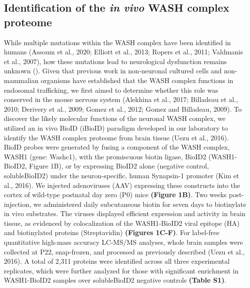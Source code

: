
\subsection{Identification of the \textit{in vivo} WASH complex proteome}

While multiple mutations within the WASH complex have been identified in humans 
(Assoum et al., 2020; Elliott et al., 2013; Ropers et al., 2011; 
Valdmanis et al., 2007), how these mutations lead to neurological
dysfunction remains unknown (). Given that previous work in
non-neuronal cultured cells and non-mammalian organisms have established that
the WASH complex functions in endosomal trafficking, we first aimed to determine
whether this role was conserved in the mouse nervous system (Alekhina et al.,
2017; Billadeau et al., 2010; Derivery et al., 2009; Gomez et al., 2012; Gomez
and Billadeau, 2009). To discover the likely molecular functions of the neuronal
WASH complex, we utilized an in vivo BioID (iBioID) paradigm developed in our
laboratory to identify the WASH complex proteome from brain tissue (Uezu et al.,
2016). BioID probes were generated by fusing a component of the WASH complex,
WASH1 (gene: Washc1), with the promiscuous biotin ligase, BioID2 (WASH1-BioID2,
Figure 1B), or by expressing BioID2 alone (negative control, solubleBioID2)
under the neuron-specific, human Synapsin-1 promoter (Kim et al., 2016). We
injected adenoviruses (AAV) expressing these constructs into the cortex of
wild-type postnatal day zero (P0) mice \textbf{(Figure 1B)}. Two weeks post-injection, we
administered daily subcutaneous biotin for seven days to biotinylate in vivo
substrates. The viruses displayed efficient expression and activity in brain
tissue, as evidenced by colocalization of the WASH1-BioID2 viral epitope (HA)
and biotinylated proteins (Streptavidin) \textbf{(Figures 1C-F)}. For label-free
quantitative high-mass accuracy LC-MS/MS analyses, whole brain samples were
collected at P22, snap-frozen, and processed as previously described (Uezu et
al., 2016). A total of 2,311 proteins were identified across all three
experimental replicates, which were further analyzed for those with significant
enrichment in WASH1-BioID2 samples over solubleBioID2 negative controls 
\textbf{(Table S1)}. 



